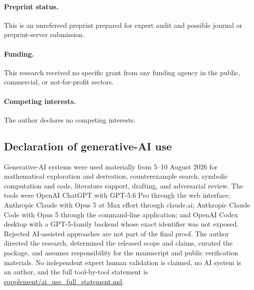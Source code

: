 \paragraph{Preprint status.}
This is an unrefereed preprint prepared for expert audit and possible journal
or preprint-server submission.

\paragraph{Funding.}
This research received no specific grant from any funding agency in the public,
commercial, or not-for-profit sectors.

\paragraph{Competing interests.}
The author declares no competing interests.

\subsection*{Declaration of generative-AI use}
Generative-AI systems were used materially from 5--10 August 2026 for
mathematical exploration and derivation, counterexample search, symbolic
computation and code, literature support, drafting, and adversarial review.  The
tools were OpenAI ChatGPT with GPT-5.6 Pro through the web interface;
Anthropic Claude with Opus 5 at Max effort through claude.ai; Anthropic Claude
Code with Opus 5 through the command-line application;
and OpenAI Codex desktop with a GPT-5-family backend whose exact identifier was
not exposed.  Rejected AI-assisted approaches are not part of the final proof.
The author directed the research, determined the released scope and claims,
curated the package, and assumes responsibility for the manuscript and public
verification materials.  No independent expert human validation is claimed,
no AI system is an author, and the full tool-by-tool statement is
\href{https://github.com/AlecKriebel/Math/blob/bimolecular-positive-recurrence-v1.1/bimolecular_positive_recurrence_submission_v1_1/supplement/ai_use_full_statement.md}{supplement/ai\_use\_full\_statement.md}.



